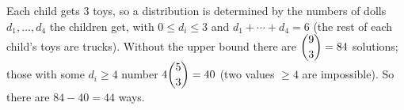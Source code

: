 Each child gets $3$ toys, so a distribution is determined by the numbers of dolls $d_1,\dots,d_4$ the children get, with $0\le d_i\le3$ and $d_1+\cdots+d_4=6$ (the rest of each child's toys are trucks). Without the upper bound there are $\dbinom{9}{3}=84$ solutions; those with some $d_i\ge4$ number $4\dbinom53=40$ (two values $\ge4$ are impossible). So there are $84-40=\boxed{44}$ ways.

